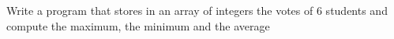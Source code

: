 Write a program that stores in an array of integers the votes of 6 students 
and compute the maximum, the minimum and the average
 

